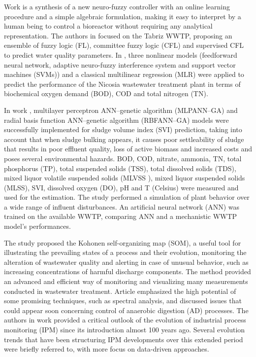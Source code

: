 Work \cite{Haggege2005} is a synthesis of a new neuro-fuzzy controller with an online learning procedure and a simple algebraic formulation, making it easy to interpret by a human being to control a bioreactor without requiring any analytical representation. The authors in \cite{Nadiri2018} focused on the Tabriz \ac{WWTP}, proposing an ensemble of fuzzy logic (FL), committee fuzzy logic (CFL)  and supervised CFL to predict water quality parameters. In \cite{Nourani2018}, three nonlinear models (feedforward neural network, adaptive neuro-fuzzy interference system and support vector machines (SVMs)) and a classical multilinear regression (MLR) were applied to predict the performance of the Nicosia wastewater treatment plant in terms of biochemical oxygen demand (BOD), \ac{COD} and total nitrogen (TN). 

In work \cite{Bagheri2015}, multilayer perceptron ANN–genetic algorithm (MLPANN–GA) and radial basis function ANN–genetic algorithm (RBFANN–GA) models were successfully implemented for sludge volume index (SVI) prediction, taking into account that when sludge bulking appears, it causes poor settleability of sludge that results in poor effluent quality, loss of active biomass and increased costs and poses several environmental hazards. BOD, \ac{COD}, nitrate, ammonia, TN, total phosphorus (TP), total suspended solids (TSS), total dissolved solids (TDS), mixed liquor volatile suspended solids (MLVSS ), mixed liquor suspended solids (MLSS), SVI, dissolved oxygen (DO), pH and T (Celsius) were measured and used for the estimation. The study \cite{Raduly2007} performed a simulation of plant behavior over a wide range of influent disturbances. An artificial neural network (ANN) was trained on the available WWTP, comparing ANN and a mechanistic WWTP model’s performances.

The study \cite{Liukkonen2013} proposed the Kohonen self-organizing map (SOM), a useful tool for illustrating the prevailing states of a process and their evolution, monitoring the alteration of wastewater quality and alerting in case of unusual behavior, such as increasing concentrations of harmful discharge components. The method provided an advanced and efficient way of monitoring and visualizing many measurements conducted in wastewater treatment. Article \cite{Jimenez2015} emphasized the high potential of some promising techniques, such as spectral analysis, and discussed issues that could appear soon concerning control of anaerobic digestion (AD) processes. The authors in work \cite{Reis2017} provided a critical outlook of the evolution of industrial process monitoring (IPM) since its introduction almost 100 years ago. Several evolution trends that have been structuring IPM developments over this extended period were briefly referred to, with more focus on data-driven approaches.

